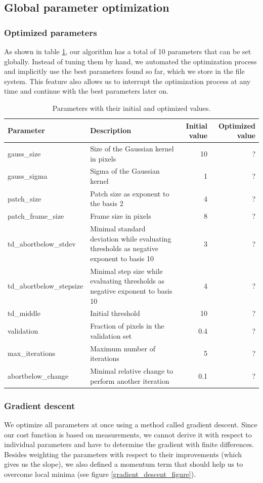 \documentclass[10pt,conference,compsocconf]{IEEEtran}
\begin{document}
\subsection{Global parameter optimization}
\subsubsection{Optimized parameters}
As shown in table \ref{parameters}, our algorithm has a total of 10 parameters that can be set globally. Instead of tuning them by hand, we automated the optimization process and implicitly use the best parameters found so far, which we store in the file system. This feature also allows us to interrupt the optimization process at any time and continue with the best parameters later on.

\begin{table}
\begin{center}
\begin{tabular}{|l|p{6cm}|r|r|}
\hline
Parameter & Description & Initial value & Optimized value\\
\hline
gauss\_size & Size of the Gaussian kernel in pixels & 10 & ? \\
gauss\_sigma & Sigma of the Gaussian kernel & 1 & ? \\
patch\_size & Patch size as exponent to the basis 2 & 4 & ? \\
patch\_frame\_size & Frame size in pixels & 8 & ? \\
td\_abortbelow\_stdev & Minimal standard deviation while evaluating thresholds as negative exponent to basis 10& 3 & ? \\
td\_abortbelow\_stepsize & Minimal step size while evaluating thresholds as negative exponent to basis 10& 4 & ? \\
td\_middle & Initial threshold & 10 & ? \\
validation & Fraction of pixels in the validation set & 0.4 & ? \\
max\_iterations & Maximum number of iterations & 5 & ? \\
abortbelow\_change & Minimal relative change to perform another iteration & 0.1 & ? \\
\hline
\end{tabular}
\end{center}
\caption{Parameters with their initial and optimized values.}
\label{parameters}
\end{table}

\subsubsection{Gradient descent}
\label{gradient_descent}
We optimize all parameters at once using a method called gradient descent. Since our cost function is based on measurements, we cannot derive it with respect to individual parameters and have to determine the gradient with finite differences. Besides weighting the parameters with respect to their improvements (which gives us the slope), we also defined a momentum term that should help us to overcome local minima (see figure \ref{gradient_descent_figure}).
\end{document}
